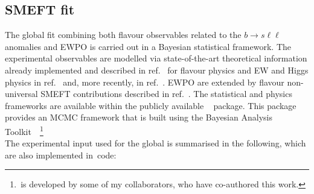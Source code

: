 \subsection{SMEFT fit}
\label{sec:strategy}
The global fit combining both flavour observables related to the $ b \to s \ell \ell$ anomalies and EWPO is carried out in a Bayesian statistical framework. The experimental observables are modelled via state-of-the-art theoretical information already implemented and described in ref.~\cite{Ciuchini:2019usw} for flavour physics and EW and Higgs physics in ref.~\cite{Ciuchini:2013pca} and, more recently, in ref.~\cite{deBlas:2016ojx}. EWPO are extended by flavour non-universal  SMEFT contributions described in ref.~\cite{Efrati:2015eaa,deBlas:2019wgy}. The statistical and physics frameworks are available within the publicly available \HEPfit~\cite{deBlas:2019okz} package. This package provides an MCMC framework that is built using the Bayesian Analysis Toolkit~\cite{2009CoPhC.180.2197C}~\footnote{ \HEPfit\,is developed by some of my collaborators, who have co-authored this work.}\\
The experimental input used for the global is summarised in the following, which are also implemented in \HEPfit\,code: 
